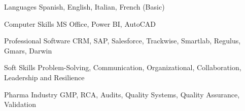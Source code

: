 

\begin{cvskills}

\cvskill
    {Languages} %
    {Spanish, English, Italian, French (Basic)} %

\cvskill
    {Computer Skills} %
    {MS Office, Power BI, AutoCAD} %

\cvskill
    {Professional Software} %
    {CRM, SAP, Salesforce, Trackwise, Smartlab, Regulus, Gmars, Darwin} %

\cvskill
    {Soft Skills} %
    {Problem-Solving, Communication, Organizational, Collaboration, Leadership and Resilience} %

\cvskill
    {Pharma Industry} %
    {GMP, RCA, Audits, Quality Systems, Quality Assurance, Validation} %


\end{cvskills}

